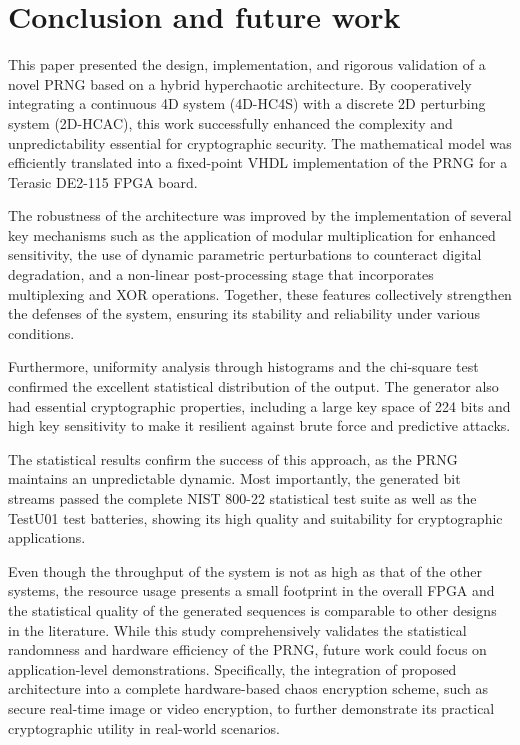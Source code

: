 \documentclass[preprint, 12pt, sort&compress]{elsarticle}
\begin{document}
\section{Conclusion and future work}\label{sec_6}
This paper presented the design, implementation, and rigorous validation of a novel PRNG based on a hybrid hyperchaotic architecture. By cooperatively integrating a continuous 4D system (4D-HC4S) with a discrete 2D perturbing system (2D-HCAC), this work successfully enhanced the complexity and unpredictability essential for cryptographic security. The mathematical model was efficiently translated into a fixed-point VHDL implementation of the PRNG for a Terasic DE2-115 FPGA board. 

The robustness of the architecture was improved by the implementation of several key mechanisms such as the application of modular multiplication for enhanced sensitivity, the use of dynamic parametric perturbations to counteract digital degradation, and a non-linear post-processing stage that incorporates multiplexing and XOR operations. Together, these features collectively strengthen the defenses of the system, ensuring its stability and reliability under various conditions.

Furthermore, uniformity analysis through histograms and the chi-square test confirmed the excellent statistical distribution of the output. The generator also had essential cryptographic properties, including a large key space of 224 bits and high key sensitivity to make it resilient against brute force and predictive attacks.

The statistical results confirm the success of this approach, as the PRNG maintains an unpredictable dynamic. Most importantly, the generated bit streams passed the complete NIST 800-22 statistical test suite as well as the TestU01 test batteries, showing its high quality and suitability for cryptographic applications.

Even though the throughput of the system is not as high as that of the other systems, the resource usage presents a small footprint in the overall FPGA and the statistical quality of the generated sequences is comparable to other designs in the literature. 
While this study comprehensively validates the statistical randomness and hardware efficiency of the PRNG, future work could focus on application-level demonstrations. Specifically, the integration of proposed architecture into a complete hardware-based chaos encryption scheme, such as secure real-time image or video encryption, to further demonstrate its practical cryptographic utility in real-world scenarios.
\end{document}
